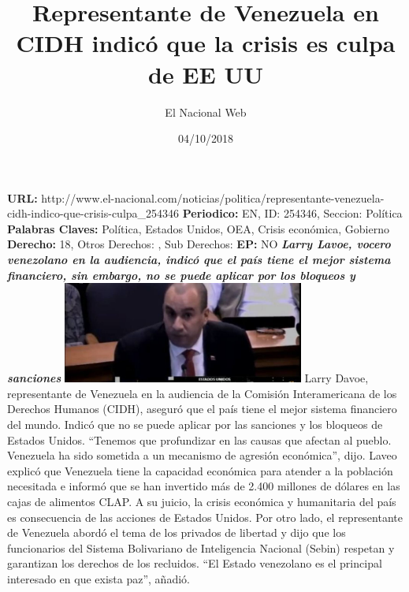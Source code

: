 \documentclass{article}%
\title{\textbf{Representante de Venezuela en CIDH indicó que la crisis es culpa de EE UU}}%
\author{El Nacional Web}%
\date{04/10/2018}%
\begin{document}
%
\normalsize%
\maketitle%
\textbf{URL: }%
http://www.el{-}nacional.com/noticias/politica/representante{-}venezuela{-}cidh{-}indico{-}que{-}crisis{-}culpa\_254346\newline%
%
\textbf{Periodico: }%
EN, %
ID: %
254346, %
Seccion: %
Política\newline%
%
\textbf{Palabras Claves: }%
Política, Estados Unidos, OEA, Crisis económica, Gobierno\newline%
%
\textbf{Derecho: }%
18, %
Otros Derechos: %
, %
Sub Derechos: %
\newline%
%
\textbf{EP: }%
NO\newline%
\newline%
%
\textbf{\textit{Larry Lavoe, vocero venezolano en la audiencia, indicó que el país tiene el mejor sistema financiero, sin embargo, no se puede aplicar por los bloqueos y sanciones}}%
\newline%
\newline%
%
\includegraphics[width=300px]{191.jpg}%
\newline%
%
Larry Davoe, representante de Venezuela en la audiencia de la Comisión Interamericana de los Derechos Humanos (CIDH), aseguró que el país tiene el mejor sistema financiero del mundo. Indicó que no se puede aplicar por las sanciones y los bloqueos de Estados Unidos.%
\newline%
%
“Tenemos que profundizar en las causas que afectan al pueblo. Venezuela ha sido sometida a un mecanismo de agresión económica”, dijo.%
\newline%
%
Laveo explicó que Venezuela tiene la capacidad económica para atender a la población necesitada e informó que se han invertido más de 2.400 millones de dólares en las cajas de alimentos CLAP. A su juicio, la crisis económica y humanitaria del país es consecuencia de las acciones de Estados Unidos.%
\newline%
%
Por otro lado, el representante de Venezuela abordó el tema de los privados de libertad y dijo que los funcionarios del Sistema Bolivariano de Inteligencia Nacional (Sebin) respetan y garantizan los derechos de los recluidos.%
\newline%
%
“El Estado venezolano es el principal interesado en que exista paz”, añadió.%
\newline%
%
\end{document}
